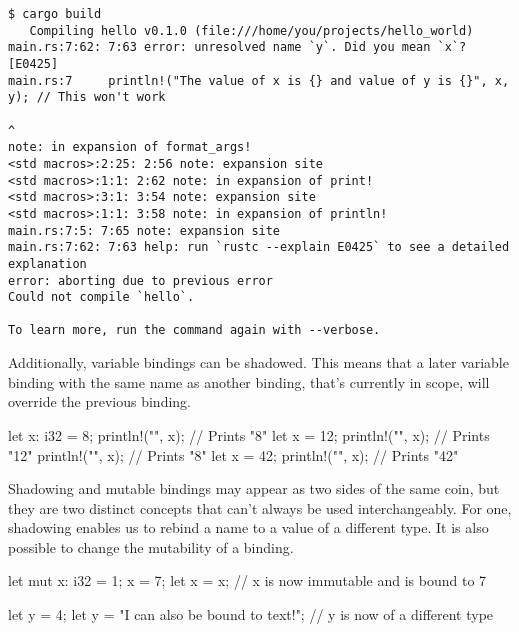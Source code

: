 \begin{verbatim}
$ cargo build
   Compiling hello v0.1.0 (file:///home/you/projects/hello_world)
main.rs:7:62: 7:63 error: unresolved name `y`. Did you mean `x`? [E0425]
main.rs:7     println!("The value of x is {} and value of y is {}", x, y); // This won't work
                                                                       ^
note: in expansion of format_args!
<std macros>:2:25: 2:56 note: expansion site
<std macros>:1:1: 2:62 note: in expansion of print!
<std macros>:3:1: 3:54 note: expansion site
<std macros>:1:1: 3:58 note: in expansion of println!
main.rs:7:5: 7:65 note: expansion site
main.rs:7:62: 7:63 help: run `rustc --explain E0425` to see a detailed explanation
error: aborting due to previous error
Could not compile `hello`.

To learn more, run the command again with --verbose.
\end{verbatim}

Additionally, variable bindings can be shadowed. This means that a later variable binding with the same name as another 
binding, that's currently in scope, will override the previous binding.

\begin{rustc}
let x: i32 = 8;
{
    println!("{}", x); // Prints "8"
    let x = 12;
    println!("{}", x); // Prints "12"
}
println!("{}", x); // Prints "8"
let x =  42;
println!("{}", x); // Prints "42"
\end{rustc}

Shadowing and mutable bindings may appear as two sides of the same coin, but they are two distinct concepts that can't always be 
used interchangeably. For one, shadowing enables us to rebind a name to a value of a different type. It is also possible to 
change the mutability of a binding.

\begin{rustc}
let mut x: i32 = 1;
x = 7;
let x = x; // x is now immutable and is bound to 7

let y = 4;
let y = "I can also be bound to text!"; // y is now of a different type
\end{rustc}
